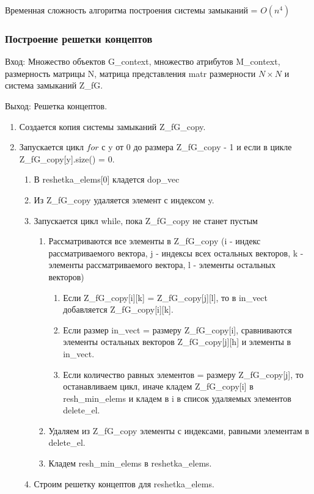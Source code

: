 \documentclass[bachelor, och, labwork]{shiza}
\begin{document}
		Временная сложность алгоритма построения системы замыканий = $O(n^4)$
			
			\subsubsection{Построение решетки концептов}		
	
	$\textit{Вход:}$ Множество объектов G\_context, множество атрибутов M\_context, размерность матрицы N, матрица представления matr размерности $N \times N$ и система замыканий Z\_fG.
	
	$\textit{Выход:}$ Решетка концептов.
	
	\begin{enumerate} 
		\item Создается копия системы замыканий Z\_fG\_copy.
		\item Запускается цикл $for$ с y от 0 до размера Z\_fG\_copy - 1 и если в цикле Z\_fG\_copy[y].size() = 0.
		\begin{enumerate} 
			\item В reshetka\_elems[0] кладется dop\_vec
			\item Из Z\_fG\_copy удаляется элемент с индексом y.
			\item Запускается цикл while, пока Z\_fG\_copy не станет пустым
				\begin{enumerate} 
					\item Рассматриваются все элементы в Z\_fG\_copy (i - индекс рассматриваемого вектора, j - индексы всех остальных векторов, k - элементы рассматриваемого вектора, l - элементы остальных векторов)
						\begin{enumerate} 
							\item Если Z\_fG\_copy[i][k] = Z\_fG\_copy[j][l], то в in\_vect добавляется Z\_fG\_copy[i][k].
							\item Если размер in\_vect = размеру Z\_fG\_copy[i], сравниваются элементы остальных векторов Z\_fG\_copy[j][h] и элементы в in\_vect.
							\item Если количество равных элементов = размеру Z\_fG\_copy[j], то останавливаем цикл, иначе кладем Z\_fG\_copy[i] в resh\_min\_elems и кладем в i в список удаляемых элементов delete\_el.
						\end{enumerate}
					\item Удаляем из Z\_fG\_copy элементы с индексами, равными элементам в delete\_el.
					\item Кладем resh\_min\_elems в reshetka\_elems.
				\end{enumerate}
			\item Строим решетку концептов для reshetka\_elems.
		\end{enumerate}
	\end{enumerate} 
\end{document}
